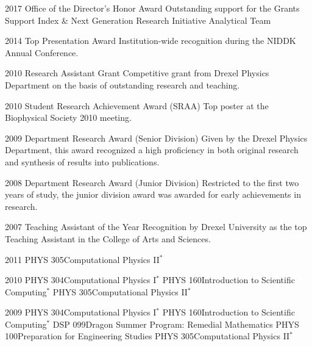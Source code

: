 \documentclass[]{scrartcl}
\begin{document}
\begin{cleanCV}


\WorkExperienceX
{2017}
{Office of the Director's Honor Award}
{Outstanding support for the Grants Support Index \& Next Generation Research Initiative Analytical Team}

\WorkExperienceX
{2014}
{Top Presentation Award}
{Institution-wide recognition during the NIDDK Annual Conference.}

\WorkExperienceX
{2010}
{Research Assistant Grant}
{Competitive grant from Drexel Physics Department on the basis of outstanding research and teaching.}

\WorkExperienceX
{2010}
{Student Research Achievement Award (SRAA)}
{Top poster at the Biophysical Society 2010 meeting. }

\WorkExperienceX
{2009}
{Department Research Award (Senior Division)}
{Given by the Drexel Physics Department, this award recognized a high proficiency in both original research and synthesis of results into publications.}

\WorkExperienceX
{2008}
{Department Research Award (Junior Division)}
{Restricted to the first two years of study, the junior division award was awarded for early achievements in research.}

\WorkExperienceX
{2007}
{Teaching Assistant of the Year}
{Recognition by Drexel University as the top Teaching Assistant in the College of Arts and Sciences.}







\newcommand{\TeachingNote}{$^*$}

\Teaching
{2011}
{PHYS 305}{Computational Physics II\TeachingNote}

\Teaching
{2010}
{PHYS 304}{Computational Physics I\TeachingNote}
\Teaching
{}
{PHYS 160}{Introduction to Scientific Computing\TeachingNote}
\Teaching
{}
{PHYS 305}{Computational Physics II\TeachingNote}

\Teaching
{2009}
{PHYS 304}{Computational Physics I\TeachingNote}
\Teaching
{}
{PHYS 160}{Introduction to Scientific Computing\TeachingNote}
\Teaching
{}
{DSP 099}{Dragon Summer Program: Remedial Mathematics}
\Teaching
{}
{PHYS 100}{Preparation for Engineering Studies}
\Teaching
{}
{PHYS 305}{Computational Physics II\TeachingNote}


\end{cleanCV}
\end{document}
